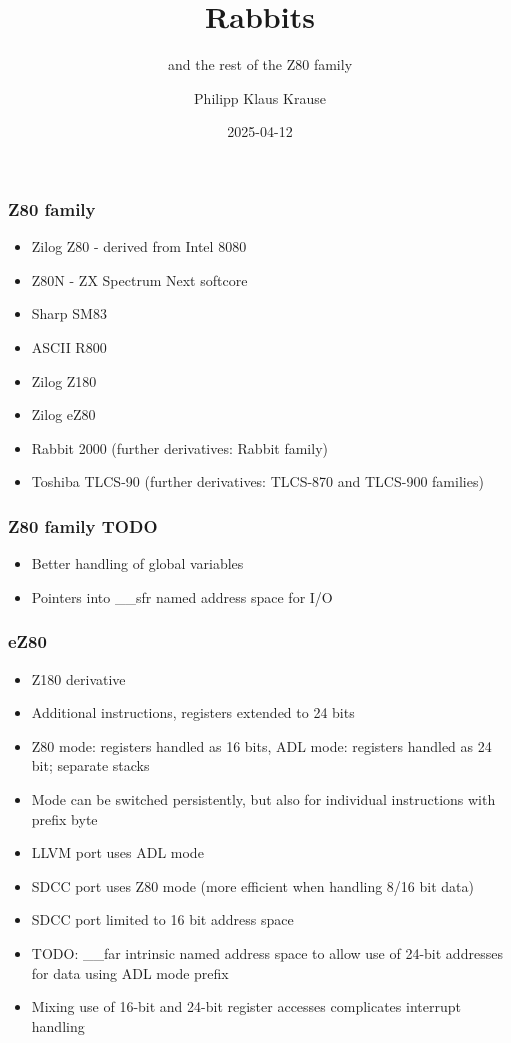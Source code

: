 \documentclass[xcolor=dvipsnames]{beamer}
\title{Rabbits}
\subtitle{and the rest of the Z80 family}
\date{2025-04-12}
\author{Philipp Klaus Krause}
\begin{document}
\begin{frame}
	\titlepage
\end{frame}

\begin{frame}
	\frametitle{Z80 family}
	\begin{itemize}
		\item Zilog Z80 - derived from Intel 8080
		\item Z80N - ZX Spectrum Next softcore
		\item Sharp SM83
		\item ASCII R800
		\item Zilog Z180
		\item Zilog eZ80
		\item Rabbit 2000 (further derivatives: Rabbit family)
		\item Toshiba TLCS-90 (further derivatives: TLCS-870 and TLCS-900 families)
	\end{itemize}
\end{frame}

\begin{frame}
	\frametitle{Z80 family TODO}
	\begin{itemize}
		\item Better handling of global variables
		\item Pointers into \_\_sfr named address space for I/O
	\end{itemize}
\end{frame}

\begin{frame}
	\frametitle{eZ80}
	\begin{itemize}
		\item Z180 derivative
		\item Additional instructions, registers extended to 24 bits
		\item Z80 mode: registers handled as 16 bits, ADL mode: registers handled as 24 bit; separate stacks
		\item Mode can be switched persistently, but also for individual instructions with prefix byte
		\item LLVM port uses ADL mode
		\item SDCC port uses Z80 mode (more efficient when handling 8/16 bit data)
		\item SDCC port limited to 16 bit address space
		\item TODO: \_\_far intrinsic named address space to allow use of 24-bit addresses for data using ADL mode prefix
		\item Mixing use of 16-bit and 24-bit register accesses complicates interrupt handling
	\end{itemize}
\end{frame}
\end{document}
